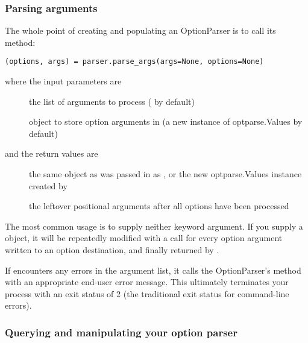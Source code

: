\subsubsection{Parsing arguments\label{optparse-parsing-arguments}}

The whole point of creating and populating an OptionParser is to call
its  method:
\begin{verbatim}
(options, args) = parser.parse_args(args=None, options=None)
\end{verbatim}

where the input parameters are
\begin{description}
\item[]
the list of arguments to process ( by default)
\item[]
object to store option arguments in (a new instance of
optparse.Values by default)
\end{description}

and the return values are
\begin{description}
\item[]
the same object as was passed in as , or the new
optparse.Values instance created by 
\item[]
the leftover positional arguments after all options have been
processed
\end{description}

The most common usage is to supply neither keyword argument.  If you
supply a  object, it will be repeatedly modified with a
 call for every option argument written to an option
destination, and finally returned by .

If  encounters any errors in the argument list, it calls
the OptionParser's  method with an appropriate end-user error
message.  This ultimately terminates your process with an exit status of
2 (the traditional \UNIX{} exit status for command-line errors).


\subsubsection{Querying and manipulating your option parser\label{optparse-querying-manipulating-option-parser}}

